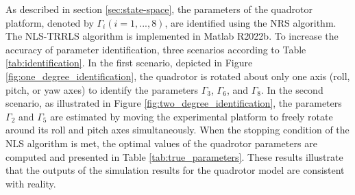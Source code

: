 \documentclass[3p,times]{elsarticle}
\begin{document}
\noindent As described in section \ref{sec:state-space}, the parameters of the quadrotor platform, denoted by $\Gamma_i (i=1, ..., 8)$, are identified using the NRS algorithm. The NLS-TRRLS algorithm is implemented in Matlab R2022b\textregistered.
To increase the accuracy of parameter identification, three scenarios according to Table \ref{tab:identification}.
In the first scenario, depicted in Figure \ref{fig:one_degree_identification}, the quadrotor is rotated about only one axis (roll, pitch, or yaw axes) to identify the parameters $\Gamma_3$, $\Gamma_6$, and $\Gamma_8$.
In the second scenario, as illustrated in Figure \ref{fig:two_degree_identification}, the parameters $\Gamma_2$ and $\Gamma_5$ are estimated by moving the experimental platform to freely rotate around its roll and pitch axes simultaneously. 
When the stopping condition of the NLS algorithm is met, the optimal values of the quadrotor parameters are computed and presented in Table \ref{tab:true_parameters}. 
These results illustrate that the outputs of the simulation results for the quadrotor model are consistent with reality.
\end{document}
